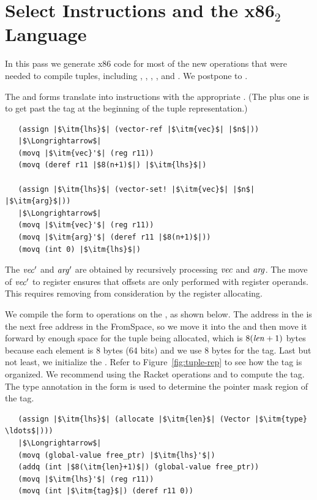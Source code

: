 \documentclass[11pt]{book}
\begin{document}
\clearpage

\section{Select Instructions and the x86$_2$ Language}
\label{sec:select-instructions-gc}


In this pass we generate x86 code for most of the new operations that
were needed to compile tuples, including ,
, , , and
. We postpone  to .

The  and  forms translate into
 instructions with the appropriate .  (The
plus one is to get past the tag at the beginning of the tuple
representation.)
\begin{lstlisting}
   (assign |$\itm{lhs}$| (vector-ref |$\itm{vec}$| |$n$|))
   |$\Longrightarrow$|
   (movq |$\itm{vec}'$| (reg r11))
   (movq (deref r11 |$8(n+1)$|) |$\itm{lhs}$|)

   (assign |$\itm{lhs}$| (vector-set! |$\itm{vec}$| |$n$| |$\itm{arg}$|))
   |$\Longrightarrow$|
   (movq |$\itm{vec}'$| (reg r11))
   (movq |$\itm{arg}'$| (deref r11 |$8(n+1)$|))
   (movq (int 0) |$\itm{lhs}$|)
\end{lstlisting}
The $\mathit{vec}'$ and $\mathit{arg}'$ are obtained by recursively
processing $\mathit{vec}$ and $\mathit{arg}$.  The move of $\mathit{vec}'$ to
register  ensures that offsets are only performed with
register operands. This requires removing  from
consideration by the register allocating.

We compile the  form to operations on the
, as shown below. The address in the 
is the next free address in the FromSpace, so we move it into the
 and then move it forward by enough space for the tuple being
allocated, which is $8(\mathit{len}+1)$ bytes because each element is 8
bytes (64 bits) and we use 8 bytes for the tag. Last but not least, we
initialize the . Refer to Figure~\ref{fig:tuple-rep} to see
how the tag is organized. We recommend using the Racket operations
 and  to compute the tag.
The type annotation in the  form is used to determine the
pointer mask region of the tag.
\begin{lstlisting}
   (assign |$\itm{lhs}$| (allocate |$\itm{len}$| (Vector |$\itm{type} \ldots$|)))
   |$\Longrightarrow$|
   (movq (global-value free_ptr) |$\itm{lhs}'$|)
   (addq (int |$8(\itm{len}+1)$|) (global-value free_ptr))
   (movq |$\itm{lhs}'$| (reg r11))
   (movq (int |$\itm{tag}$|) (deref r11 0))
\end{lstlisting}
\end{document}
